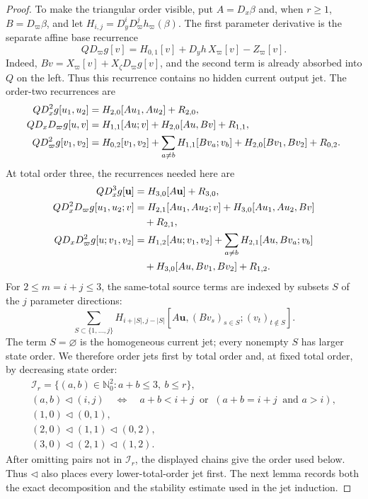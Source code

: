 \documentclass[11pt]{amsart}
\numberwithin{equation}{section}
\theoremstyle{definition}
\theoremstyle{remark}
\begin{document}
\begin{proof}
To make the triangular order visible, put
$A=D_x\beta$ and, when $r\ge1$, $B=D_\varpi\beta$, and let
$H_{i,j}=D_y^iD_\varpi^jh_\varpi(\beta)$.  The first parameter derivative
is the separate affine base recurrence
\begin{equation}\label{eq:corridor-first-parameter-recurrence}
 QD_\varpi g[v]
 =H_{0,1}[v]+D_yh\,X_\varpi[v]-Z_\varpi[v].
\end{equation}
Indeed, $Bv=X_\varpi[v]+X_\zeta D_\varpi g[v]$, and the second term is
already absorbed into $Q$ on the left.  Thus this recurrence contains no
hidden current output jet.  The order-two recurrences are
\begin{align}
 QD_x^2g[u_1,u_2]
 &=H_{2,0}[Au_1,Au_2]+R_{2,0},\notag\\
 QD_xD_\varpi g[u,v]
 &=H_{1,1}[Au;v]+H_{2,0}[Au,Bv]+R_{1,1},
 \label{eq:corridor-order-two-recurrences}\\
 QD_\varpi^2g[v_1,v_2]
 &=H_{0,2}[v_1,v_2]
   +\sum_{a\ne b}H_{1,1}[Bv_a;v_b]
   +H_{2,0}[Bv_1,Bv_2]+R_{0,2}.\notag
\end{align}
At total order three, the recurrences needed here are
\begin{align}
 QD_x^3g[\mathbf u]
 &=H_{3,0}[A\mathbf u]+R_{3,0},\notag\\
 QD_x^2D_\varpi g[u_1,u_2;v]
 &=H_{2,1}[Au_1,Au_2;v]
   +H_{3,0}[Au_1,Au_2,Bv]\notag\\
 &\quad+R_{2,1},
 \label{eq:corridor-order-three-recurrences}\\
 QD_xD_\varpi^2g[u;v_1,v_2]
 &=H_{1,2}[Au;v_1,v_2]
   +\sum_{a\ne b}H_{2,1}[Au,Bv_a;v_b]\notag\\
 &\quad
   +H_{3,0}[Au,Bv_1,Bv_2]+R_{1,2}.\notag
\end{align}
For $2\le m=i+j\le3$, the same-total source terms are indexed by subsets
$S$ of the $j$ parameter directions:
\begin{equation}\label{eq:corridor-same-order-source-terms}
 \sum_{S\subset\{1,\ldots,j\}}
 H_{i+|S|,j-|S|}
 [A\mathbf u,(Bv_s)_{s\in S};(v_t)_{t\notin S}].
\end{equation}
The term $S=\varnothing$ is the homogeneous current jet; every nonempty
$S$ has larger state order.  We therefore order jets first by total order
and, at fixed total order, by decreasing state order:
\begin{equation}\label{eq:corridor-triangular-jet-order}
 \begin{gathered}
 \mathcal I_r=\{(a,b)\in\mathbb N_0^2:a+b\le3,\ b\le r\},\\
 (a,b)\triangleleft(i,j)
 \quad\Longleftrightarrow\quad
 a+b<i+j\ \text{ or }\ (a+b=i+j\ \text{ and }a>i),\\
 (1,0)\triangleleft(0,1),\\
 (2,0)\triangleleft(1,1)\triangleleft(0,2),\\
 (3,0)\triangleleft(2,1)\triangleleft(1,2).
 \end{gathered}
\end{equation}
After omitting pairs not in $\mathcal I_r$, the displayed chains give the
order used below.  Thus $\triangleleft$ also places every
lower-total-order jet first.
The next lemma records both the exact decomposition and the stability
estimate used in the jet induction.


\end{proof}
\end{document}
